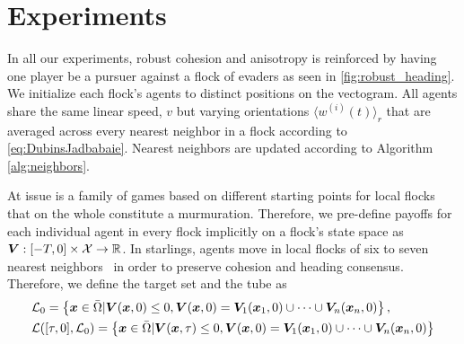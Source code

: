 \section{Experiments}
\label{sec:expts}
%
In all our experiments, robust cohesion and anisotropy is reinforced by having one player be a pursuer against a flock of evaders as seen in \autoref{fig:robust_heading}. We initialize each flock's agents to distinct positions on the vectogram. All agents share the same linear speed, $v$ but varying orientations $\langle w^{(i)} (t) \rangle_r$ that are averaged across every nearest neighbor in a flock according to \eqref{eq:DubinsJadbabaie}. Nearest neighbors are updated according to Algorithm \ref{alg:neighbors}.
%

%
At issue is a family of games based on different starting points for local flocks that on the whole constitute a murmuration. Therefore, we pre-define payoffs for each individual agent in every flock implicitly on a flock's state space as $\bm{V}: [-T, 0]\times \mathcal{X} \rightarrow \mathbb{R}$. 
%
In starlings, agents move in local flocks of six to seven nearest neighbors~\cite{Ballerini1232} in order to preserve cohesion and heading consensus. Therefore, we define the target set and the tube as
%
\begin{align}
	&\mathcal{L}_0 = \left\{ \bm{x} \in \bar{\Omega} | \bm{V}(\bm{x}, 0) \le 0, \bm{V}(\bm{x}, 0) = \bm{V}_1(\bm{x}_1, 0) \cup \cdots \cup \bm{V}_n(\bm{x}_n, 0)\right\} , \\
	&\mathcal{L}([\tau, 0],  \mathcal{L}_0) = \left\{\bm{x}\in \bar{\Omega}  | \bm{V}(\bm{x}, \tau) \le 0, \bm{V}(\bm{x}, 0) = \bm{V}_1(\bm{x}_1, 0) \cup \cdots \cup \bm{V}_n(\bm{x}_n, 0)\right\} \nonumber
\end{align}
